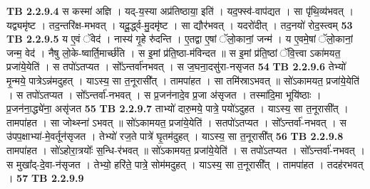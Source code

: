 \documentclass[17pt]{extarticle}
\begin{document}
                  \newline
                                \textbf{ TB 2.2.9.4} \newline
                  स कस्मा॑ अज्ञि । यद्-य॒स्या अप्र॑तिष्ठाया॒ इति॑ । यद॒फ्स्व॑-वाप॑द्यत । सा पृ॑थि॒व्य॑भवत् । यद्व्यमृ॑ष्ट । तद॒न्तरि॑क्ष-मभवत् । यदू॒र्द्ध्व-मु॒दमृ॑ष्ट । सा द्यौर॑भवत् । यदरो॑दीत् । तद॒नयो॑ रोद॒स्त्वम् \textbf{ 53} \newline
                  \newline
                                \textbf{ TB 2.2.9.5} \newline
                  य ए॒वं ॅवेद॑ । नास्य॑ गृ॒हे रु॑दन्ति । ए॒तद्वा ए॒षां ॅलो॒कानां॒ जन्म॑ । य ए॒वमे॒षां ॅलो॒कानां॒ जन्म॒ वेद॑ । नैषु लो॒के-ष्वार्ति॒मार्च्छ॑ति । स इ॒मां प्र॑ति॒ष्ठा-म॑विन्दत ॥ स इ॒मां प्र॑ति॒ष्ठां ॅवि॒त्त्वा ऽका॑मयत॒ प्रजा॑ये॒येति॑ । स तपो॑ऽतप्यत । सो᳚ऽन्तर्वा॑नभवत् । स ज॒घना॒दसु॑रा-नसृजत \textbf{ 54} \newline
                  \newline
                                \textbf{ TB 2.2.9.6} \newline
                  तेभ्यो॑ मृ॒न्मये॒ पात्रेऽन्न॑मदुहत् । याऽस्य॒ सा त॒नूरासी᳚त् । तामपा॑हत । सा तमि॑स्राऽभवत् ॥ सो॑ऽकामयत॒ प्रजा॑ये॒येति॑ । स तपो॑ऽतप्यत । सो᳚ऽन्तर्वा॑-नभवत् । स प्र॒जन॑नादे॒व प्र॒जा अ॑सृजत । तस्मा॑दि॒मा भूयि॑ष्ठाः । प्र॒जन॑ना॒द्ध्ये॑ना॒ असृ॑जत \textbf{ 55} \newline
                  \newline
                                \textbf{ TB 2.2.9.7} \newline
                  ताभ्यो॑ दारु॒मये॒ पात्रे॒ पयो॑ऽदुहत । याऽस्य॒ सा त॒नूरासी᳚त् । तामपा॑हत । सा जोथ्स्ना॑ ऽभवत् ॥ सो॑ऽकामयत॒ प्रजा॑ये॒येति॑ । सतपो॑ऽतप्यत । सो᳚ऽन्तर्वा॑-नभवत् । स उ॑पप॒क्षाभ्या॑-मे॒वर्तून॑सृजत । तेभ्यो॑ रज॒ते पात्रे॑ घृ॒तम॑दुहत् । याऽस्य॒ सा त॒नूरासी᳚त् \textbf{ 56} \newline
                  \newline
                                \textbf{ TB 2.2.9.8} \newline
                  तामपा॑हत । सो॑ऽहोरा॒त्रयोः᳚ स॒न्धि-र॑भवत् ॥ सो॑ऽकामयत॒ प्रजा॑ये॒येति॑ । स तपो॑ऽतप्यत । सो᳚ऽन्तर्वा॑-नभवत् । स मुखा᳚द्-दे॒वा-न॑सृजत । तेभ्यो॒ हरि॑ते॒ पात्रे॒ सोम॑मदुहत् । याऽस्य॒ सा त॒नूरासी᳚त् । तामपा॑हत । तदह॑रभवत् । \textbf{ 57} \newline
                  \newline
                                \textbf{ TB 2.2.9.9} \newline
\end{document}
